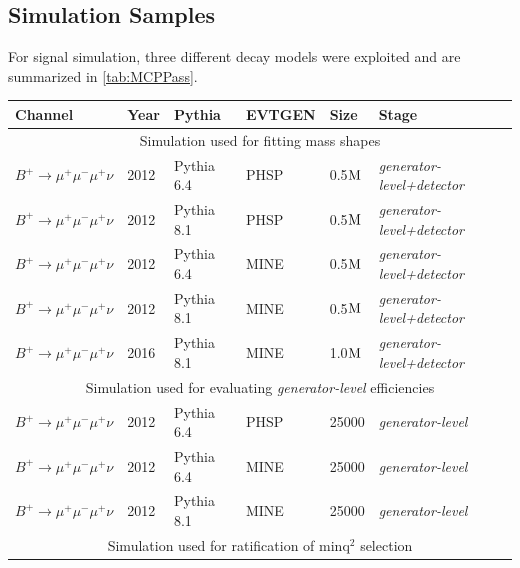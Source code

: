 \subsection{Simulation Samples }
\label{Simulation Samples}
For signal simulation, three different decay models were exploited and are summarized in \autoref{tab:MCPPass}.

\begin{table}[h!]
	\begin{center}
		\begin{tabular}{l l l l l l}

			Channel & Year & Pythia  & EVTGEN & Size & Stage \\ \hline
			 \multicolumn{6}{c}{Simulation used for fitting mass shapes} \\ \hline
			$B^{+} \rightarrow \mu^{+} \mu^{-} \mu^{+} \nu$ & 2012 & Pythia 6.4\cite{pythia6} & PHSP & 0.5$\rm{M}$ & \textit{generator-level+detector}\\
			$B^{+} \rightarrow \mu^{+} \mu^{-} \mu^{+} \nu$ & 2012 & Pythia 8.1\cite{pythia8} & PHSP & 0.5$\rm{M}$ & \textit{generator-level+detector}\\
			$B^{+} \rightarrow \mu^{+} \mu^{-} \mu^{+} \nu$ & 2012 & Pythia 6.4\cite{pythia6} & MINE & 0.5$\rm{M}$ & \textit{generator-level+detector}\\
			$B^{+} \rightarrow \mu^{+} \mu^{-} \mu^{+} \nu$ & 2012 & Pythia 8.1\cite{pythia8} & MINE & 0.5$\rm{M}$ & \textit{generator-level+detector}\\
			$B^{+} \rightarrow \mu^{+} \mu^{-} \mu^{+} \nu$ & 2016 & Pythia 8.1\cite{pythia8} & MINE & 1.0$\rm{M}$ & \textit{generator-level+detector}\\ \hline
			 \multicolumn{6}{c}{Simulation used for evaluating \textit{generator-level} efficiencies} \\ \hline
			$B^{+} \rightarrow \mu^{+} \mu^{-} \mu^{+} \nu$ & 2012 & Pythia 6.4\cite{pythia6} & PHSP & 25000 & \textit{generator-level}\\ %
			$B^{+} \rightarrow \mu^{+} \mu^{-} \mu^{+} \nu$ & 2012 & Pythia 6.4\cite{pythia6} & MINE & 25000 & \textit{generator-level}\\
			$B^{+} \rightarrow \mu^{+} \mu^{-} \mu^{+} \nu$ & 2012 & Pythia 8.1\cite{pythia8} & MINE & 25000 & \textit{generator-level}\\ \hline

                         \multicolumn{6}{c}{Simulation used for ratification of minq$^{2}$ selection} \\ \hline 


\end{tabular}
\end{center}
\end{table}
